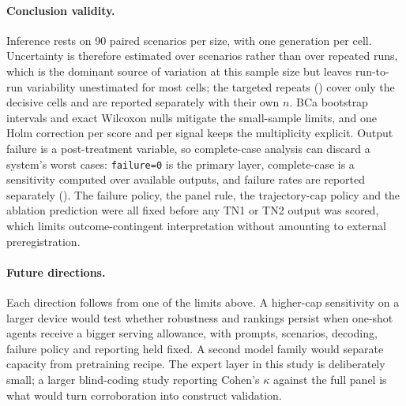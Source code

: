 \paragraph{Conclusion validity.}
Inference rests on 90 paired scenarios per size, with one generation
per cell. Uncertainty is therefore estimated over scenarios rather than over repeated
runs, which is the dominant source of variation at this sample size but leaves
run-to-run variability unestimated for most cells; the targeted repeats
() cover only the decisive cells and are reported separately with
their own $n$. BCa bootstrap intervals and exact Wilcoxon nulls mitigate the
small-sample limits, and one Holm correction per score and per signal keeps the
multiplicity explicit. Output failure is a post-treatment
variable, so complete-case analysis can discard a system's worst cases:
\texttt{failure=0} is the primary layer, complete-case is a sensitivity computed over
available outputs, and failure rates are reported separately (). The
failure policy, the panel rule, the trajectory-cap policy and the ablation prediction
were all fixed before any TN1 or TN2 output was scored, which limits
outcome-contingent interpretation without amounting to external preregistration.

\paragraph{Future directions.}
\label{sec:future-work}
Each direction follows from one of the limits above. A higher-cap sensitivity on a
larger device would test whether robustness and rankings persist when one-shot agents
receive a bigger serving allowance, with prompts, scenarios, decoding, failure policy
and reporting held fixed. A second model family would separate capacity from
pretraining recipe. The expert layer in this study is deliberately small; a larger
blind-coding study reporting Cohen's $\kappa$ against the full panel is what would
turn corroboration into construct validation.

